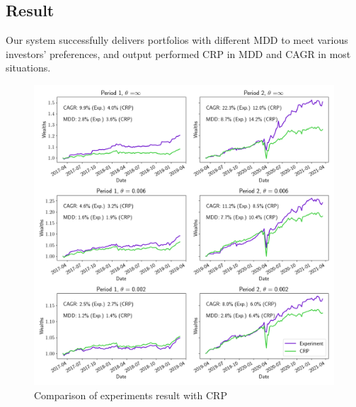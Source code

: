\subsection{Result}
Our system successfully delivers portfolios with different MDD to meet various investors' preferences, and output performed CRP in MDD and CAGR in most situations.





\begin{figure}[htb]
\centering
  \includegraphics[width=16cm]{images/crp_compare.png}
  \caption [Comparison of experiments result with CRP]{Comparison of experiments result with CRP}
  \label{fig:crp_compare}
\end{figure}